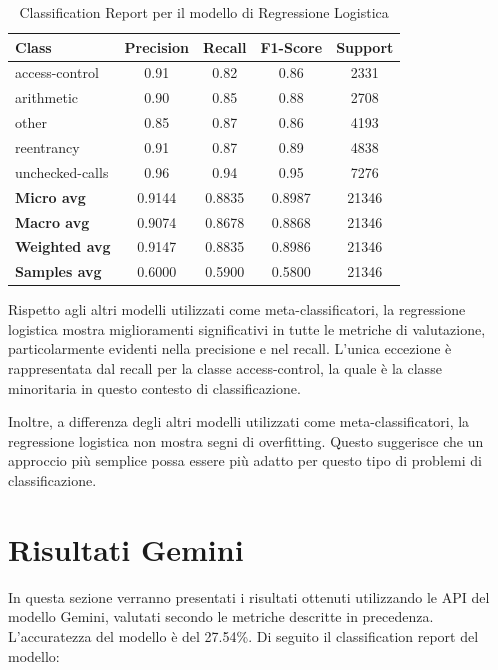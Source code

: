 \documentclass[../../Thesis.tex]{subfiles}
\begin{document}
\begin{table}[H]
    \centering
    \small
    \begin{tabular}{lcccc}
    \hline
    \textbf{Class} & \textbf{Precision} & \textbf{Recall} & \textbf{F1-Score} & \textbf{Support} \\
    \hline
    access-control & 0.91 & 0.82 & 0.86 & 2331 \\
    arithmetic & 0.90 & 0.85 & 0.88 & 2708 \\
    other & 0.85 & 0.87 & 0.86 & 4193 \\
    reentrancy & 0.91 & 0.87 & 0.89 & 4838 \\
    unchecked-calls & 0.96 & 0.94 & 0.95 & 7276 \\
    \hline
    \textbf{Micro avg} & 0.9144 & 0.8835 & 0.8987 & 21346 \\
    \textbf{Macro avg} & 0.9074 & 0.8678 & 0.8868 & 21346 \\
    \textbf{Weighted avg} & 0.9147 & 0.8835 & 0.8986 & 21346 \\
    \textbf{Samples avg} & 0.6000 & 0.5900 & 0.5800 & 21346 \\
    \hline
    \end{tabular}
    \caption{Classification Report per il modello di Regressione Logistica}
\end{table}
Rispetto agli altri modelli utilizzati come meta-classificatori, la regressione logistica mostra miglioramenti significativi in tutte le metriche di valutazione, particolarmente evidenti nella precisione e nel recall. L'unica eccezione è rappresentata dal recall per la classe access-control, la quale è la classe minoritaria in questo contesto di classificazione.

Inoltre, a differenza degli altri modelli utilizzati come meta-classificatori, la regressione logistica non mostra segni di overfitting. Questo suggerisce che un approccio più semplice possa essere più adatto per questo tipo di problemi di classificazione.



\section{Risultati Gemini}

In questa sezione verranno presentati i risultati ottenuti utilizzando le API del modello Gemini, valutati secondo le metriche descritte in precedenza.\\
L'accuratezza del modello è del 27.54\%. Di seguito il classification report del modello:
\end{document}
